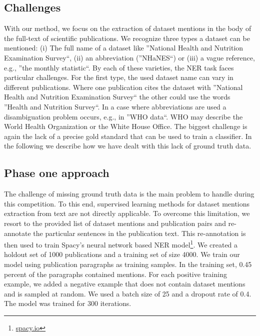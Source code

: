 \subsection{Challenges}
With our method, we focus on the extraction of dataset mentions in the body of the full-text of scientific publications. We recognize three types a dataset can be mentioned: (i) The full name of a dataset like ''National Health and Nutrition Examination Survey``, (ii) an abbreviation (''NHaNES``) or (iii) a vague reference, e.g., ''the monthly statistic``. 
By each of these varieties, the NER task faces particular challenges. For the first type, the used dataset name can vary in different publications. Where one publication cites the dataset with ''National Health and Nutrition Examination Survey`` the other could use the words  ''Health and Nutrition Survey``.
In a case where abbreviations are used a disambiguation problem occurs, e.g., in ''WHO data``. WHO may describe the World Health Organization or the White House Office.
The biggest challenge is again the lack of a precise gold standard that can be used to train a classifier.
In the following we describe how we have dealt with this lack of ground truth data.  
\subsection{Phase one approach}
The challenge of missing ground truth data is the main problem to handle during this competition. To this end, supervised learning methods for dataset mentions extraction from text are not directly applicable. To overcome this limitation, we resort to the provided list of dataset mentions and publication pairs and re-annotate the particular sentences in the publication text. This re-annotation is then used to train Spacy's neural network based NER model\footnote{\url{spacy.io}}. We created a holdout set of 1000 publications and a training set of size 4000. We train our model using publication paragraphs as training samples. In the training set, 0.45 percent of the paragraphs contained mentions.  For each positive training example, we added a negative example that does not contain dataset mentions and is sampled at random.  
We used a batch size of 25 and a dropout rate of 0.4. The model was trained for 300 iterations.
